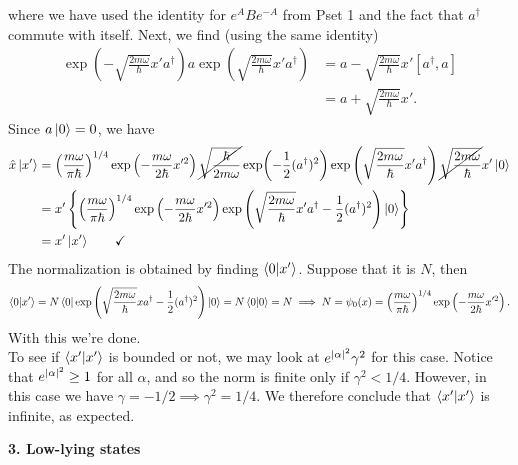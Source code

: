\documentclass{article}
\theoremstyle{definition}
\newcommand{\al}{\alpha}
\newcommand{\f}[2]{\frac{#1}{#2}}
\newcommand{\lp}{\left(}
\newcommand{\rp}{\right)}
\newcommand{\lc}{\left\{}
\newcommand{\rc}{\right\}}
\begin{document}
\begin{enumerate}[label=(\alph*)]
	where we have used the identity for $e^A B e^{-A}$ from Pset 1 and the fact that $a^\dagger$ commute with itself. Next, we find (using the same identity) 
	\begin{align*}
	\exp\lp -\sqrt{\f{2m\omega}{\hbar}} x' {a}^\dagger  \rp  a \exp\lp \sqrt{\f{2m\omega}{\hbar}} x' {a}^\dagger  \rp
	&= a -\sqrt{\f{2m\omega}{\hbar}}x'[a^\dagger,a]\\
	&= a + \sqrt{\f{2m\omega}{\hbar}}  x'.
	\end{align*}
	Since $a\ket{0} = 0$, we have
	\begin{align*}
	\hat{x}\ket{x'} &= \lp \f{m\omega}{\pi \hbar} \rp^{1/4} \exp\lp -\f{m\omega}{2\hbar} x'^2\rp \cancel{\sqrt{\f{\hbar}{2m\omega}}} \exp(-\f{1}{2}(a^\dagger)^2) 
	\exp\lp \sqrt{\f{2m\omega}{\hbar}} x' {a}^\dagger  \rp \cancel{\sqrt{\f{2m\omega}{\hbar}}}  x' \ket{0}\\
	&= x' \lc  \lp \f{m\omega}{\pi \hbar} \rp^{1/4} \exp\lp -\f{m\omega}{2\hbar} x'^2\rp\exp\lp \sqrt{\f{2m\omega}{\hbar}} x' {a}^\dagger - \f{1}{2}({a}^\dagger)^2 \rp \ket{0}\rc\\
	&= x'\ket{x'} \quad\quad\checkmark
	\end{align*}
	The normalization is obtained by finding $\bra{0}\ket{x'}$. Suppose that it is $N$, then 
	\begin{align*}
	\bra{0}\ket{x'} = N\bra{0}\exp\lp \sqrt{\f{2m\omega}{\hbar}} x a^\dagger - \f{1}{2}(a^\dagger)^2 \rp \ket{0} = N\braket{0} = N \implies  N = \psi_0(x) =  \lp \f{m\omega}{\pi \hbar} \rp^{1/4} \exp\lp -\f{m\omega}{2\hbar} x'^2\rp.
	\end{align*}
	With this we're done. \\
	
	To see if $\braket{x'}$ is bounded or not, we may look at $e^{\abs{\al}^2} \gamma^2$ for this case. Notice that $e^{\abs{\al}^2} \geq 1$ for all $\al$, and so the norm is finite only if $\gamma^2 < 1/4$. However, in this case we have $\gamma = -1/2 \implies \gamma^2 = 1/4$. We therefore conclude that $\braket{x'}$ is infinite, as expected. 
	
	
\end{enumerate}

\noindent \textbf{3. Low-lying states}
\end{document}
